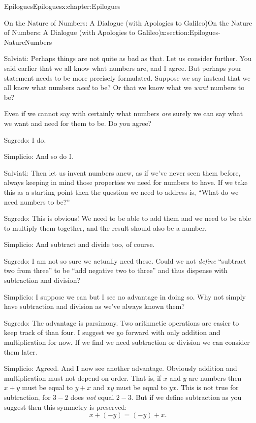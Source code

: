 \begin{chapterptx}{Epilogues}{}{Epilogues}{}{}{x:chapter:Epilogues}
\begin{sectionptx}{On the Nature of Numbers: A Dialogue (with Apologies to Galileo)}{}{On the Nature of Numbers: A Dialogue (with Apologies to Galileo)}{}{}{x:section:Epilogues-NatureNumbers}
\begin{introduction}{}
			\alert{Salviati}:  Perhaps things are not quite as bad as that. Let us consider further. You said earlier that we all know what numbers are, and I agree. But perhaps your statement needs to be more precisely formulated. Suppose we say instead that we all know what numbers \emph{need} to be? Or that we know what we \emph{want} numbers to be?%
			\par
			Even if we cannot say with certainly what numbers \emph{are} surely we can say what we want and need for them to be. Do you agree?%
			\par
			\alert{Sagredo}:  I do.%
			\par
			\alert{Simplicio}:  And so do I.%
			\par
			\alert{Salviati}:  Then let us invent numbers anew, as if we've never seen them before, always keeping in mind those properties we need for numbers to have. If we take this as a starting point then the question we need to address is, ``What do we need numbers to be?''%
			\par
			\alert{Sagredo}:  This is obvious! We need to be able to add them and we need to be able to multiply them together, and the result should also be a number.%
			\par
			\alert{Simplicio}:  And subtract and divide too, of course.%
			\par
			\alert{Sagredo}:  I am not so sure we actually need these. Could we not \emph{define} ``subtract two from three'' to be ``add negative two to three'' and thus dispense with subtraction and division?%
			\par
			\alert{Simplicio}:  I suppose we can but I see no advantage in doing so. Why not simply have subtraction and division as we've always known them?%
			\par
			\alert{Sagredo}:  The advantage is parsimony. Two arithmetic operations are easier to keep track of than four. I suggest we go forward with only addition and multiplication for now. If we find we need subtraction or division we can consider them later.%
			\par
			\alert{Simplicio}:  Agreed. And I now see another advantage. Obviously addition and multiplication must not depend on order. That is, if \(x\) and \(y\) are numbers then \(x+y\) must be equal to \(y+x\) and \(xy\) must be equal to \(yx\). This is not true for subtraction, for \(3-2\) does \emph{not} equal \(2-3\). But if we define subtraction as you suggest then this symmetry is preserved:%
			\begin{equation*}
				x+(-y) = (-y)+x\text{.}

\end{equation*}
\end{introduction}
\end{sectionptx}
\end{chapterptx}
